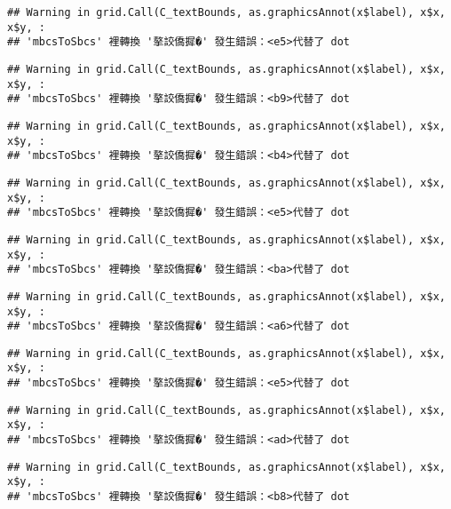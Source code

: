 \documentclass[
]{article}
\begin{document}
\begin{verbatim}
## Warning in grid.Call(C_textBounds, as.graphicsAnnot(x$label), x$x, x$y, :
## 'mbcsToSbcs' 裡轉換 '摮詨僑摨�' 發生錯誤：<e5>代替了 dot
\end{verbatim}

\begin{verbatim}
## Warning in grid.Call(C_textBounds, as.graphicsAnnot(x$label), x$x, x$y, :
## 'mbcsToSbcs' 裡轉換 '摮詨僑摨�' 發生錯誤：<b9>代替了 dot
\end{verbatim}

\begin{verbatim}
## Warning in grid.Call(C_textBounds, as.graphicsAnnot(x$label), x$x, x$y, :
## 'mbcsToSbcs' 裡轉換 '摮詨僑摨�' 發生錯誤：<b4>代替了 dot
\end{verbatim}

\begin{verbatim}
## Warning in grid.Call(C_textBounds, as.graphicsAnnot(x$label), x$x, x$y, :
## 'mbcsToSbcs' 裡轉換 '摮詨僑摨�' 發生錯誤：<e5>代替了 dot
\end{verbatim}

\begin{verbatim}
## Warning in grid.Call(C_textBounds, as.graphicsAnnot(x$label), x$x, x$y, :
## 'mbcsToSbcs' 裡轉換 '摮詨僑摨�' 發生錯誤：<ba>代替了 dot
\end{verbatim}

\begin{verbatim}
## Warning in grid.Call(C_textBounds, as.graphicsAnnot(x$label), x$x, x$y, :
## 'mbcsToSbcs' 裡轉換 '摮詨僑摨�' 發生錯誤：<a6>代替了 dot
\end{verbatim}

\begin{verbatim}
## Warning in grid.Call(C_textBounds, as.graphicsAnnot(x$label), x$x, x$y, :
## 'mbcsToSbcs' 裡轉換 '摮詨僑摨�' 發生錯誤：<e5>代替了 dot
\end{verbatim}

\begin{verbatim}
## Warning in grid.Call(C_textBounds, as.graphicsAnnot(x$label), x$x, x$y, :
## 'mbcsToSbcs' 裡轉換 '摮詨僑摨�' 發生錯誤：<ad>代替了 dot
\end{verbatim}

\begin{verbatim}
## Warning in grid.Call(C_textBounds, as.graphicsAnnot(x$label), x$x, x$y, :
## 'mbcsToSbcs' 裡轉換 '摮詨僑摨�' 發生錯誤：<b8>代替了 dot
\end{verbatim}
\end{document}
